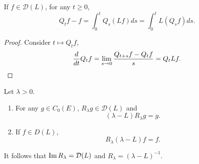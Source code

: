 \begin{cor}
    If $f \in \mathcal{D}(L)$, for any $t \geq 0$,
    \begin{equation*}
        Q_t f - f = \int_0^t Q_s(Lf)ds = \int_0^t L(Q_s f)ds.
    \end{equation*}
\end{cor}
\begin{proof}
    Consider $t \mapsto Q_t f$,
    \begin{equation*}
        \frac{d}{dt}Q_tf = \lim_{s \rightarrow 0} \frac{Q_{t+s}f - Q_t f}{s} = Q_tLf. \qedhere
    \end{equation*}
\end{proof}

\begin{prop}
    Let $\lambda > 0$.
    \begin{enumerate}[label=(\arabic{*})]
        \item For any $g \in C_0(E)$, $R_\lambda g \in \mathcal{D}(L)$ and
        \begin{equation*}
            (\lambda - L)R_\lambda g = g.
        \end{equation*}
        \item If $f \in D(L)$,
        \begin{equation*}
            R_\lambda (\lambda - L) f = f.
        \end{equation*}
    \end{enumerate}
    It follows that $\operatorname{Im} R_\lambda = \mathcal{D}(L)$ and $R_\lambda = (\lambda - L)^{-1}$.
\end{prop}
